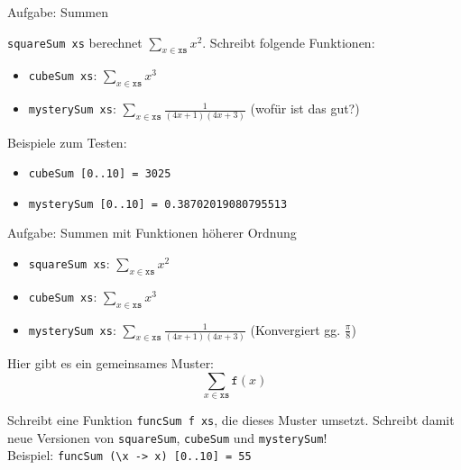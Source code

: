 \documentclass{beamer}
\begin{document}
\begin{frame}{Aufgabe: Summen}

  \texttt{squareSum xs} berechnet $\sum\limits_{x \in \texttt{xs}} x^2$.
  Schreibt folgende Funktionen:

  \begin{itemize}
    \item \texttt{cubeSum xs}: $\sum\limits_{x \in \texttt{xs}} x^3$
    \item \texttt{mysterySum xs}: $\sum\limits_{x \in \texttt{xs}} \frac{1}{(4x + 1)(4x + 3)}$ (wofür ist das gut?)
  \end{itemize}

  Beispiele zum Testen:

  \begin{itemize}
    \item \texttt{cubeSum [0..10] = 3025}
    \item \texttt{mysterySum [0..10] = 0.38702019080795513}
  \end{itemize}
\end{frame}

\begin{frame}{Aufgabe: Summen mit Funktionen höherer Ordnung}
  \begin{itemize}
    \item \texttt{squareSum xs}: $\sum\limits_{x \in \texttt{xs}} x^2$
    \item \texttt{cubeSum xs}: $\sum\limits_{x \in \texttt{xs}} x^3$
    \item \texttt{mysterySum xs}: $\sum\limits_{x \in \texttt{xs}} \frac{1}{(4x + 1)(4x + 3)}$ (Konvergiert gg. $\frac{\pi}{8}$)
  \end{itemize}

  Hier gibt es ein gemeinsames Muster:
  \pause
  $$
  \sum\limits_{x \in \texttt{xs}} \texttt{f}(x)
  $$

  Schreibt eine Funktion \texttt{funcSum f xs}, die dieses Muster umsetzt. Schreibt damit neue Versionen von \texttt{squareSum}, \texttt{cubeSum} und \texttt{mysterySum}!\\
  Beispiel: \texttt{funcSum (\textbackslash{}x -> x) [0..10] = 55}
\end{frame}
\end{document}
